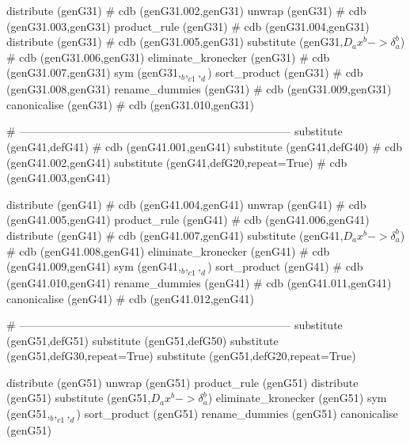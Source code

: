 \documentclass[12pt]{cdblatex}
\begin{document}
\begin{cadabra}
   distribute     (genG31)                                    # cdb (genG31.002,genG31)
   unwrap         (genG31)                                    # cdb (genG31.003,genG31)
   product_rule   (genG31)                                    # cdb (genG31.004,genG31)
   distribute     (genG31)                                    # cdb (genG31.005,genG31)
   substitute     (genG31,$D_{a}{x^b}->\delta_{a}^{b}$)       # cdb (genG31.006,genG31)
   eliminate_kronecker (genG31)                               # cdb (genG31.007,genG31)
   sym            (genG31,$_{b}, _{c1}, _{d}$)
   sort_product   (genG31)                                    # cdb (genG31.008,genG31)
   rename_dummies (genG31)                                    # cdb (genG31.009,genG31)
   canonicalise   (genG31)                                    # cdb (genG31.010,genG31)

   # --------------------------------------------------------------------------
   substitute     (genG41,defG41)                             # cdb (genG41.001,genG41)
   substitute     (genG41,defG40)                             # cdb (genG41.002,genG41)
   substitute     (genG41,defG20,repeat=True)                 # cdb (genG41.003,genG41)

   distribute     (genG41)                                    # cdb (genG41.004,genG41)
   unwrap         (genG41)                                    # cdb (genG41.005,genG41)
   product_rule   (genG41)                                    # cdb (genG41.006,genG41)
   distribute     (genG41)                                    # cdb (genG41.007,genG41)
   substitute     (genG41,$D_{a}{x^b}->\delta_{a}^{b}$)       # cdb (genG41.008,genG41)
   eliminate_kronecker (genG41)                               # cdb (genG41.009,genG41)
   sym            (genG41,$_{b}, _{c1}, _{d}$)
   sort_product   (genG41)                                    # cdb (genG41.010,genG41)
   rename_dummies (genG41)                                    # cdb (genG41.011,genG41)
   canonicalise   (genG41)                                    # cdb (genG41.012,genG41)

   # --------------------------------------------------------------------------
   substitute     (genG51,defG51)
   substitute     (genG51,defG50)
   substitute     (genG51,defG30,repeat=True)
   substitute     (genG51,defG20,repeat=True)

   distribute     (genG51)
   unwrap         (genG51)
   product_rule   (genG51)
   distribute     (genG51)
   substitute     (genG51,$D_{a}{x^b}->\delta_{a}^{b}$)
   eliminate_kronecker (genG51)
   sym            (genG51,$_{b}, _{c1}, _{d}$)
   sort_product   (genG51)
   rename_dummies (genG51)
   canonicalise   (genG51)


\end{cadabra}
\end{document}

